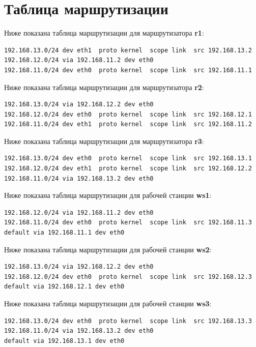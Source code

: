 \documentclass[a4paper,12pt]{article}
\begin{document}
\section{Таблица маршрутизации}

Ниже показана таблица маршрутизации для маршрутизатора \textbf{r1}:

\begin{Verbatim}
192.168.13.0/24 dev eth1  proto kernel  scope link  src 192.168.13.2 
192.168.12.0/24 via 192.168.11.2 dev eth0 
192.168.11.0/24 dev eth0  proto kernel  scope link  src 192.168.11.1
\end{Verbatim}

Ниже показана таблица маршрутизации для маршрутизатора \textbf{r2}:

\begin{Verbatim}
192.168.13.0/24 via 192.168.12.2 dev eth0 
192.168.12.0/24 dev eth0  proto kernel  scope link  src 192.168.12.1 
192.168.11.0/24 dev eth1  proto kernel  scope link  src 192.168.11.2
\end{Verbatim}

Ниже показана таблица маршрутизации для маршрутизатора \textbf{r3}:

\begin{Verbatim}
192.168.13.0/24 dev eth0  proto kernel  scope link  src 192.168.13.1 
192.168.12.0/24 dev eth1  proto kernel  scope link  src 192.168.12.2 
192.168.11.0/24 via 192.168.13.2 dev eth0
\end{Verbatim}

Ниже показана таблица маршрутизации для рабочей станции \textbf{ws1}:

\begin{Verbatim}
192.168.12.0/24 via 192.168.11.2 dev eth0 
192.168.11.0/24 dev eth0  proto kernel  scope link  src 192.168.11.3 
default via 192.168.11.1 dev eth0
\end{Verbatim}

Ниже показана таблица маршрутизации для рабочей станции \textbf{ws2}:

\begin{Verbatim}
192.168.13.0/24 via 192.168.12.2 dev eth0 
192.168.12.0/24 dev eth0  proto kernel  scope link  src 192.168.12.3 
default via 192.168.12.1 dev eth0
\end{Verbatim}

Ниже показана таблица маршрутизации для рабочей станции \textbf{ws3}:

\begin{Verbatim}
192.168.13.0/24 dev eth0  proto kernel  scope link  src 192.168.13.3 
192.168.11.0/24 via 192.168.13.2 dev eth0 
default via 192.168.13.1 dev eth0
\end{Verbatim}
\end{document}
